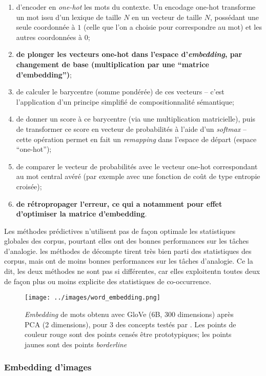 \documentclass[french]{article}
\begin{document}
				\begin{enumerate}[label=(\roman*)]
					\item d'encoder en \textit{one-hot} les mots du contexte. Un encodage one-hot transforme un mot issu d'un lexique de taille $N$ en un vecteur de taille $N$, possédant une seule coordonnée à $1$ (celle que l'on a choisie pour correspondre au mot) et les autres coordonnées à $0$;
					\item \textbf{de plonger les vecteurs one-hot dans l'espace d'\textit{embedding}, par changement de base (multiplication par une ``matrice d'embedding'')};
					\item de calculer le barycentre (somme pondérée) de ces vecteurs -- c'est l'application d'un principe simplifié de compositionnalité sémantique;
					\item de donner un score à ce barycentre (via une multiplication matricielle), puis de transformer ce score en vecteur de probabilités à l'aide d'un \textit{softmax} -- cette opération permet en fait un \textit{remapping} dans l'espace de départ (espace ``one-hot'');
					\item de comparer le vecteur de probabilités avec le vecteur one-hot correspondant au mot central avéré (par exemple avec une fonction de coût de type entropie croisée);
					\item \textbf{de rétropropager l'erreur, ce qui a notamment pour effet d'optimiser la matrice d'embedding}.
				\end{enumerate}
				Les méthodes prédictives n'utilisent pas de façon optimale les statistiques globales des corpus, pourtant elles ont des bonnes performances sur les tâches d'analogie. les méthodes de décompte tirent très bien parti des statistiques des corpus, mais ont de moins bonnes performances sur les tâches d'analogie.
			Ce la dit, les deux méthodes ne sont pas si différentes, car elles exploitentn toutes deux de façon plus ou moins explicite des statistiques de co-occurrence.
			\begin{figure}[H]
				\texttt{[image: ../images/word\_embedding.png]}
				\caption{\textit{Embedding} de mots obtenu avec GloVe (6B, 300 dimensions) après PCA (2 dimensions), pour 3 des concepts testés par \cite{rosch1975}. Les points de couleur rouge sont des points censés être prototypiques; les points jaunes sont des points \textit{borderline}}
			\end{figure}
			\subsubsection{Embedding d'images}
\end{document}

